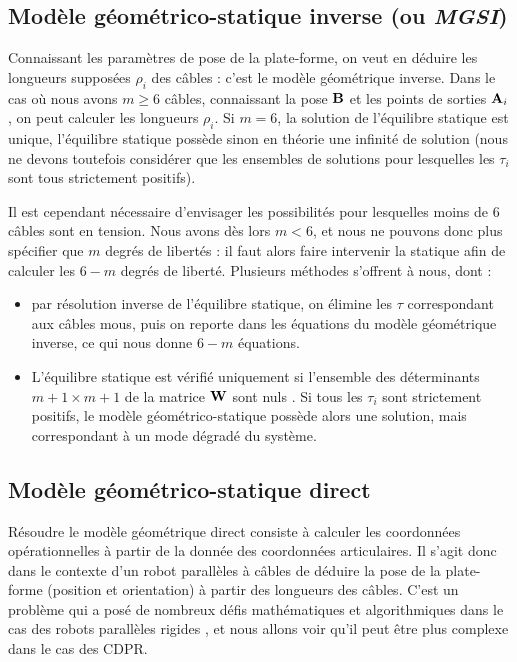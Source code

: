 \subsection{Modèle géométrico-statique inverse (ou {\it MGSI})} 
\label{chap0-1-3}


Connaissant les paramètres de pose de la plate-forme, on veut en déduire les 
longueurs supposées $\rho_i$ des câbles : c'est le modèle géométrique inverse. 
Dans le cas où nous avons $m \geq 6$ câbles, connaissant la pose 
${\bf B}$ et les points de sorties ${\bf A}_i$, on peut calculer les longueurs 
$\rho_i$. Si $m = 6$, la solution de l'équilibre statique est unique, 
l'\'equilibre statique possède sinon en théorie une infinité de solution (nous 
ne devons toutefois consid\'erer que les ensembles de solutions pour lesquelles 
les $\tau_i$ sont tous strictement positifs).

Il est cependant n\'ecessaire d'envisager les possibilit\'es pour lesquelles 
moins de $6$ c\^ables sont en tension. Nous avons d\`es lors $m < 6$, et nous 
ne pouvons donc plus sp\'ecifier que $m$ degr\'es de libert\'es : il faut alors 
faire intervenir la statique afin de calculer les $6-m$ degr\'es de libert\'e. 
Plusieurs m\'ethodes s'offrent \`a nous, dont :
\begin{itemize}
 \item par r\'esolution inverse de l'\'equilibre statique, on \'elimine les 
$\tau$ correspondant aux c\^ables mous, puis on reporte dans les \'equations du 
mod\`ele g\'eom\'etrique inverse, ce qui nous donne $6-m$ \'equations.
\item L'équilibre statique est vérifié 
uniquement si l'ensemble des déterminants $m+1 \times m+1$ de la matrice ${\bf 
W}$ sont nuls \cite{carricato_merlet2013}. Si tous les $\tau_i$ sont 
strictement positifs, le modèle géométrico-statique possède alors une solution, 
mais correspondant à un mode dégradé du système.
\end{itemize}


\subsection{Modèle géométrico-statique direct}\label{chap0-1-4}

Résoudre le modèle géométrique direct consiste à calculer les coordonnées 
opéra\-tionnelles à partir de la donnée des coordonnées articulaires. Il s'agit 
donc dans le contexte d'un robot parallèles à câbles de déduire la pose de la 
plate-forme (position et orientation) à partir des longueurs des câbles. C'est 
un problème qui a posé de nombreux défis mathématiques et algorithmiques dans 
le 
cas des robots parallèles rigides \cite{merlet1997robots}, et nous allons voir 
qu'il peut \^etre plus complexe dans le cas des CDPR.

